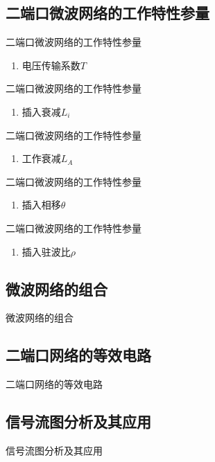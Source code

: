 \subsection{二端口微波网络的工作特性参量}
\begin{frame}{二端口微波网络的工作特性参量}
    \begin{enumerate}
        \item 电压传输系数$T$
    \end{enumerate}
\end{frame}

\begin{frame}{二端口微波网络的工作特性参量}
    \begin{enumerate}
        \item 插入衰减$L_i$
    \end{enumerate}
\end{frame}

\begin{frame}{二端口微波网络的工作特性参量}
    \begin{enumerate}
        \item 工作衰减$L_A$
    \end{enumerate}
\end{frame}

\begin{frame}{二端口微波网络的工作特性参量}
    \begin{enumerate}
        \item 插入相移$\theta$
    \end{enumerate}
\end{frame}

\begin{frame}{二端口微波网络的工作特性参量}
    \begin{enumerate}
        \item 插入驻波比$\rho$
    \end{enumerate}
\end{frame}

\subsection{微波网络的组合}
\begin{frame}{微波网络的组合}

\end{frame}

\subsection{二端口网络的等效电路}
\begin{frame}{二端口网络的等效电路}

\end{frame}

\subsection{信号流图分析及其应用}
\begin{frame}{信号流图分析及其应用}

\end{frame}

